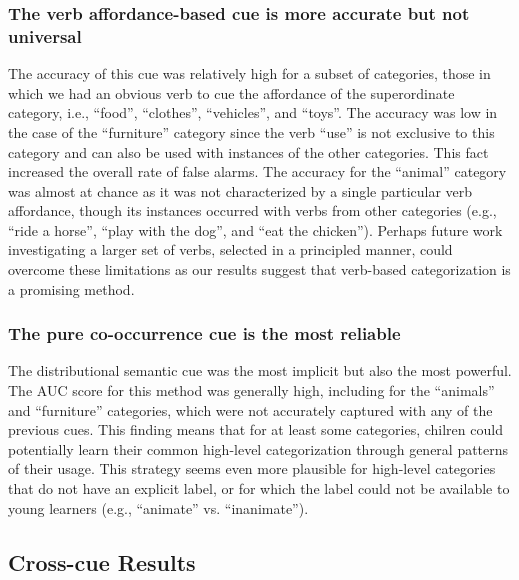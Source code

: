 \documentclass[10pt, letterpaper]{article}
\begin{document}
\hypertarget{the-affordance-based-cue-is-more-accurate-but-not-universal}{%
\subsubsection{The verb affordance-based cue is more accurate but not
universal}\label{the-affordance-based-cue-is-more-accurate-but-not-universal}}

The accuracy of this cue was relatively high for a subset of categories, those in which we had an obvious verb to cue the
affordance of the superordinate category, i.e., ``food'', ``clothes'',
``vehicles'', and ``toys''. The accuracy was low in the case of the
``furniture'' category since the verb ``use'' is not exclusive to this
category and can also be used with instances of the other categories.
This fact increased the overall rate of false alarms. The accuracy for the
``animal'' category was almost at chance as it was not characterized
by a single particular verb affordance, though its instances occurred with verbs from other
categories (e.g., ``ride a horse'', ``play with the dog'', and ``eat the
chicken''). Perhaps future work investigating a larger set of verbs, selected in a principled manner, could overcome these limitations as our results suggest that verb-based categorization is a promising method.

\hypertarget{the-pure-co-occurrence-cue-is-the-most-reliable}{%
\subsubsection{The pure co-occurrence cue is the most
reliable}\label{the-pure-co-occurrence-cue-is-the-most-reliable}}

The distributional semantic cue was the most implicit but also the most powerful. The AUC score for this method was generally high, including for the ``animals'' and ``furniture''
categories, which were not accurately captured with any of the previous
cues. This finding means that for at least some categories, chilren could potentially
learn their common high-level categorization through general patterns of their usage. This
strategy seems even more plausible for high-level categories that do not
have an explicit label, or for which the label could not be available to
young learners (e.g., ``animate'' vs. ``inanimate'').

\subsection{Cross-cue Results}
\end{document}
